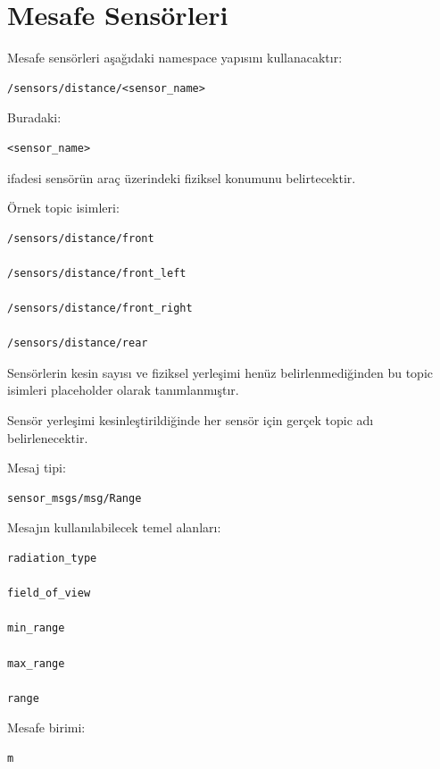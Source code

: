 \documentclass[12pt,a4paper]{article}
\begin{document}
\section{Mesafe Sensörleri}

Mesafe sensörleri aşağıdaki namespace yapısını kullanacaktır:

\begin{verbatim}
/sensors/distance/<sensor_name>
\end{verbatim}

Buradaki:

\begin{verbatim}
<sensor_name>
\end{verbatim}

ifadesi sensörün araç üzerindeki fiziksel konumunu belirtecektir.

Örnek topic isimleri:

\begin{verbatim}
/sensors/distance/front

/sensors/distance/front_left

/sensors/distance/front_right

/sensors/distance/rear
\end{verbatim}

Sensörlerin kesin sayısı ve fiziksel yerleşimi henüz belirlenmediğinden
bu topic isimleri placeholder olarak tanımlanmıştır.

Sensör yerleşimi kesinleştirildiğinde her sensör için gerçek topic adı
belirlenecektir.

Mesaj tipi:

\begin{verbatim}
sensor_msgs/msg/Range
\end{verbatim}

Mesajın kullanılabilecek temel alanları:

\begin{verbatim}
radiation_type

field_of_view

min_range

max_range

range
\end{verbatim}

Mesafe birimi:

\begin{verbatim}
m
\end{verbatim}
\end{document}
